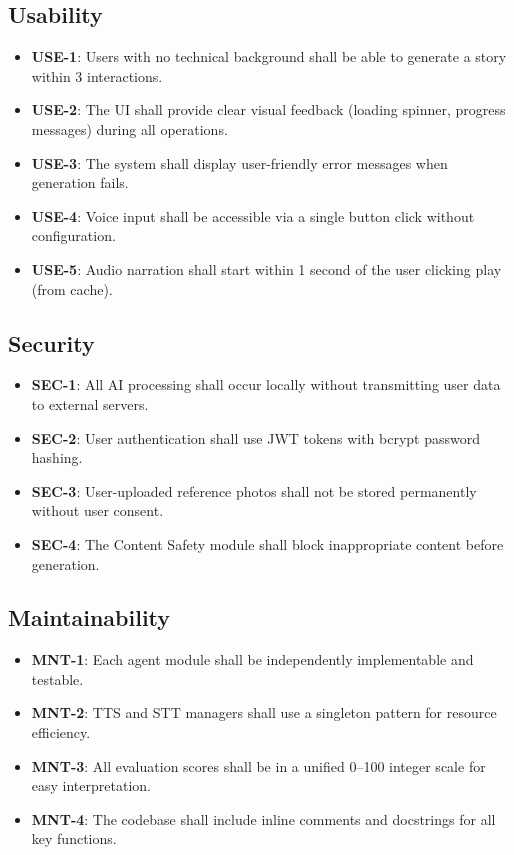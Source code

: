 \subsection{Usability}
\begin{itemize}
    \item \textbf{USE-1}: Users with no technical background shall be able to generate a story within 3 interactions.
    \item \textbf{USE-2}: The UI shall provide clear visual feedback (loading spinner, progress messages) during all operations.
    \item \textbf{USE-3}: The system shall display user-friendly error messages when generation fails.
    \item \textbf{USE-4}: Voice input shall be accessible via a single button click without configuration.
    \item \textbf{USE-5}: Audio narration shall start within 1 second of the user clicking play (from cache).
\end{itemize}

\subsection{Security}
\begin{itemize}
    \item \textbf{SEC-1}: All AI processing shall occur locally without transmitting user data to external servers.
    \item \textbf{SEC-2}: User authentication shall use JWT tokens with bcrypt password hashing.
    \item \textbf{SEC-3}: User-uploaded reference photos shall not be stored permanently without user consent.
    \item \textbf{SEC-4}: The Content Safety module shall block inappropriate content before generation.
\end{itemize}

\subsection{Maintainability}
\begin{itemize}
    \item \textbf{MNT-1}: Each agent module shall be independently implementable and testable.
    \item \textbf{MNT-2}: TTS and STT managers shall use a singleton pattern for resource efficiency.
    \item \textbf{MNT-3}: All evaluation scores shall be in a unified 0--100 integer scale for easy interpretation.
    \item \textbf{MNT-4}: The codebase shall include inline comments and docstrings for all key functions.
\end{itemize}

